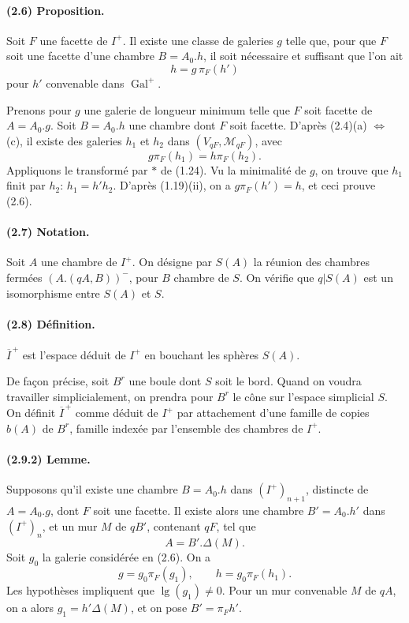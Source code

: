 \documentclass[10pt]{article}
\begin{document}
\paragraph{(2.6) Proposition.} Soit \(F\) une facette de \(I^+\). Il existe une classe de galeries \(g\) telle que, pour que \(F\) soit une facette d'une chambre \(B=A_0.h\), il soit nécessaire et suffisant que l'on ait
\[
h=g\,\pi_F(h')
\]
pour \(h'\) convenable dans \(\operatorname{Gal}^+\).

Prenons pour \(g\) une galerie de longueur minimum telle que \(F\) soit facette de \(A=A_0.g\). Soit \(B=A_0.h\) une chambre dont \(F\) soit facette. D'après (2.4)(a) \(\Leftrightarrow\) (c), il existe des galeries \(h_1\) et \(h_2\) dans \((V_{qF},\mathcal M_{qF})\), avec
\[
g\pi_F(h_1)=h\pi_F(h_2).
\]
Appliquons le transformé par \(*\) de (1.24). Vu la minimalité de \(g\), on trouve que \(h_1\) finit par \(h_2\): \(h_1=h'h_2\). D'après (1.19)(ii), on a \(g\pi_F(h')=h\), et ceci prouve (2.6).

\paragraph{(2.7) Notation.} Soit \(A\) une chambre de \(I^+\). On désigne par \(S(A)\) la réunion des chambres fermées \((A.(qA,B))^{-}\), pour \(B\) chambre de \(S\). On vérifie que \(q|S(A)\) est un isomorphisme entre \(S(A)\) et \(S\).

\paragraph{(2.8) Définition.} \(\overline I^{\, +}\) est l'espace déduit de \(I^+\) en bouchant les sphères \(S(A)\).

De façon précise, soit \(B^r\) une boule dont \(S\) soit le bord. Quand on voudra travailler simplicialement, on prendra pour \(B^r\) le cône sur l'espace simplicial \(S\). On définit \(\overline I^{\, +}\) comme déduit de \(I^+\) par attachement d'une famille de copies \(b(A)\) de \(B^r\), famille indexée par l'ensemble des chambres de \(I^+\).

\paragraph{(2.9.2) Lemme.} Supposons qu'il existe une chambre \(B=A_0.h\) dans \((I^+)_{n+1}\), distincte de \(A=A_0.g\), dont \(F\) soit une facette. Il existe alors une chambre \(B'=A_0.h'\) dans \((I^+)_n\), et un mur \(M\) de \(qB'\), contenant \(qF\), tel que
\[
A=B'.\Delta(M).
\]
Soit \(g_0\) la galerie considérée en (2.6). On a
\[
g=g_0\pi_F(g_1),\qquad h=g_0\pi_F(h_1).
\]
Les hypothèses impliquent que \(\operatorname{lg}(g_1)\ne0\). Pour un mur convenable \(M\) de \(qA\), on a alors \(g_1=h'\Delta(M)\), et on pose \(B'=\pi_F h'\).
\end{document}
